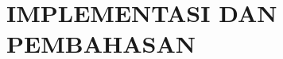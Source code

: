 \documentclass[../../SKRIPSI_ALDZIKRI_DWIJAYANTO_PRATHAMA.tex]{subfiles}
\begin{document}
\chapter{IMPLEMENTASI DAN PEMBAHASAN}



\end{document}
